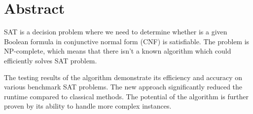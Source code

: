 \documentclass{article}
\begin{document}
\section{Abstract}
SAT is a decision problem where we need to determine whether is a given Boolean formula in conjunctive normal form (CNF) is satisfiable. The problem is NP-complete, which means that there isn’t a known algorithm which could efficiently solves SAT problem.

The testing results of the algorithm demonstrate its efficiency and accuracy on various benchmark SAT problems. The new approach significantly reduced the runtime compared to classical methods. The potential of the algorithm is further proven by its ability to handle more complex instances.
\end{document}
